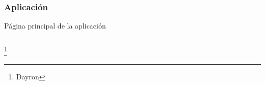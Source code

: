 \documentclass[14pt]{beamer}
\begin{document}
\begin{frame}
\frametitle{Aplicación}
Página principal de la aplicación
\begin{columns}
\begin{column}{0.25\textwidth}
\begin{center}


\end{center}
\end{column}

\end{columns}
\footnote{Dayron}
\end{frame}
\end{document}
